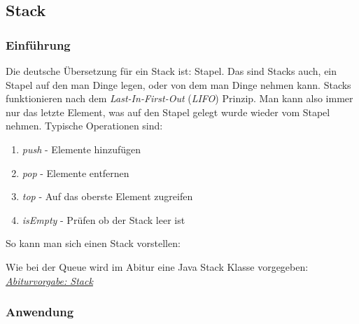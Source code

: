 \subsection{Stack}
\subsubsection{Einführung}

\begin{flushleft}
    Die deutsche Übersetzung für ein Stack ist: Stapel.
    Das sind Stacks auch, ein Stapel auf den man Dinge legen, oder von dem man Dinge nehmen kann.
    Stacks funktionieren nach dem \textit{Last-In-First-Out} (\textit{LIFO}) Prinzip.
    Man kann also immer nur das letzte Element, was auf den Stapel gelegt wurde wieder vom Stapel nehmen.
    Typische Operationen sind:
    \begin{enumerate}
        \item {
                \textit{push} - Elemente hinzufügen
            }
        \item {
                \textit{pop} - Elemente entfernen
            }
        \item {
                \textit{top} - Auf das oberste Element zugreifen
            }
        \item {
                \textit{isEmpty} - Prüfen ob der Stack leer ist
            }
    \end{enumerate}
    So kann man sich einen Stack vorstellen:
\end{flushleft}

\begin{center}
\end{center}

\begin{flushleft}
    Wie bei der Queue wird im Abitur eine Java Stack Klasse vorgegeben:
    \href{https://raw.githubusercontent.com/tim-tm/informatik-notes/main/code/Stack.java}{\textit{Abiturvorgabe: Stack}} \\
\end{flushleft}

\subsubsection{Anwendung}
